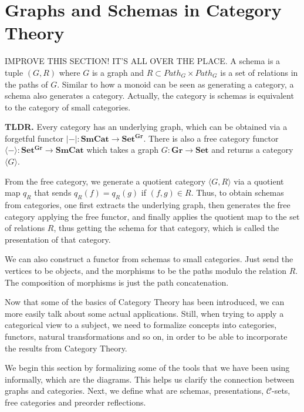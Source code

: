 \section{Graphs and Schemas in Category Theory}

IMPROVE THIS SECTION! IT'S ALL OVER THE PLACE.
A schema is a tuple $(G,R)$ where $G$ is a graph and
$R \subset Path_G \times Path_G$ is a set of relations in the paths of $G$.
Similar to how a monoid can be seen as generating a category, a schema
also generates a category. Actually, the category is schemas is equivalent
to the category of small categories.

\begin{shaded}
  \textbf{TLDR.}
  Every category has an underlying graph, which can be obtained via a forgetful functor
  $|-|:\mathbf{SmCat} \to \mathbf{Set^{\mathbf{Gr}}}$.
  There is also a free category functor $\langle-\rangle:\mathbf{Set^\mathbf{Gr}} \to \mathbf{SmCat}$
  which takes a graph $G:\mathbf{Gr}\to \mathbf{Set}$ and returns a category $\langle G \rangle$.

  From the free category, we generate a quotient category $\langle G, R \rangle$ via a quotient
  map $q_R$ that sends $q_R(f) = q_R(g)$ if $(f,g) \in R$.
  Thus, to obtain schemas from categories, one first extracts the underlying graph, then
  generates the free category applying the free functor, and finally applies the quotient map
  to the set of relations $R$, thus getting the schema for that category, which is called the
  presentation of that category.

  We can also construct a functor from schemas to small categories. Just send the vertices
  to be objects, and the morphisms to be the paths modulo the relation $R$. The composition
  of morphisms is just the path concatenation.
\end{shaded}



Now that some of the basics of Category Theory has been introduced, we can more
easily talk about some actual applications. Still, when trying to apply a categorical
view to a subject, we need to formalize concepts into categories, functors, natural
transformations and so on, in order to be able to incorporate the results from Category Theory.

We begin this section by formalizing some of the tools that we have been using informally,
which are the diagrams.
This helps us clarify the connection between graphs and categories.
Next, we define what are schemas, presentations, $\mathcal C$-sets, free categories
and preorder reflections.

